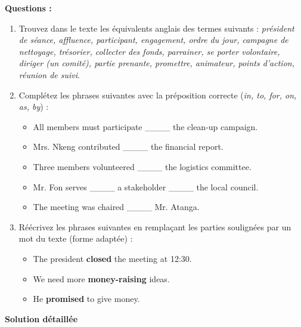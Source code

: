 \documentclass[11pt]{article}
\begin{document}
\begin{exoresolu}
\textbf{Questions :}
\begin{enumerate}
    \item Trouvez dans le texte les équivalents anglais des termes suivants : \textit{président de séance, affluence, participant, engagement, ordre du jour, campagne de nettoyage, trésorier, collecter des fonds, parrainer, se porter volontaire, diriger (un comité), partie prenante, promettre, animateur, points d'action, réunion de suivi}.
    \item Complétez les phrases suivantes avec la préposition correcte (\textit{in, to, for, on, as, by}) :
    \begin{itemize}
        \item All members must participate \_\_\_\_ the clean-up campaign.
        \item Mrs. Nkeng contributed \_\_\_\_ the financial report.
        \item Three members volunteered \_\_\_\_ the logistics committee.
        \item Mr. Fon serves \_\_\_\_ a stakeholder \_\_\_\_ the local council.
        \item The meeting was chaired \_\_\_\_ Mr. Atanga.
    \end{itemize}
    \item Réécrivez les phrases suivantes en remplaçant les parties soulignées par un mot du texte (forme adaptée) :
    \begin{itemize}
        \item The president \textbf{closed} the meeting at 12:30.
        \item We need more \textbf{money-raising} ideas.
        \item He \textbf{promised} to give money.
    \end{itemize}
\end{enumerate}

\tcblower

\textbf{Solution détaillée}


\end{exoresolu}
\end{document}
